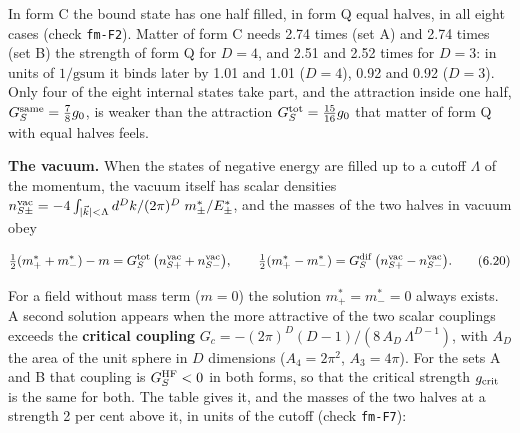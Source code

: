 \documentclass[
  10pt,
]{article}
\begin{document}
In form C the bound state has one half filled, in form Q equal halves,
in all eight cases (check \texttt{fm-F2}). Matter of form C needs 2.74
times (set A) and 2.74 times (set B) the strength of form Q for \(D=4\),
and 2.51 and 2.52 times for \(D=3\): in units of \(1/\mathrm{gsum}\) it
binds later by 1.01 and 1.01 (\(D=4\)), 0.92 and 0.92 (\(D=3\)). Only
four of the eight internal states take part, and the attraction inside
one half, \(G_S^{\rm same}=\tfrac78g_0\), is weaker than the attraction
\(G_S^{\rm tot}=\tfrac{15}{16}g_0\) that matter of form Q with equal
halves feels.

\textbf{The vacuum.} When the states of negative energy are filled up to
a cutoff \(\Lambda\) of the momentum, the vacuum itself has scalar
densities
\(n_{S\pm}^{\rm vac}=-4\int_{|\vec k|<\Lambda}d^Dk/(2\pi)^D\;m^*_\pm/E^*_\pm\),
and the masses of the two halves in vacuum obey

\[\tfrac12(m^*_++m^*_-)-m=G_S^{\rm tot}\,\big(n_{S+}^{\rm vac}+n_{S-}^{\rm vac}\big),\qquad
\tfrac12(m^*_+-m^*_-)=G_S^{\rm dif}\,\big(n_{S+}^{\rm vac}-n_{S-}^{\rm vac}\big).\tag{6.20}\]

For a field without mass term (\(m=0\)) the solution \(m^*_+=m^*_-=0\)
always exists. A second solution appears when the more attractive of the
two scalar couplings exceeds the \textbf{critical coupling}
\(G_c=-(2\pi)^D(D-1)/(8\,A_D\,\Lambda^{D-1})\), with \(A_D\) the area of
the unit sphere in \(D\) dimensions (\(A_4=2\pi^2\), \(A_3=4\pi\)). For
the sets A and B that coupling is \(G_S^{\rm HF}<0\) in both forms, so
that the critical strength \(g_{\rm crit}\) is the same for both. The
table gives it, and the masses of the two halves at a strength 2 per
cent above it, in units of the cutoff (check \texttt{fm-F7}):
\end{document}
